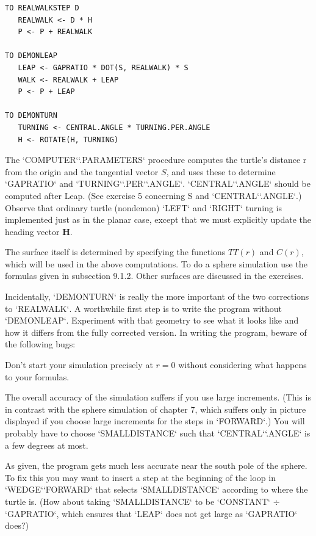 \documentclass{book}
\begin{document}
\begin{verbatim}
TO REALWALKSTEP D
   REALWALK <- D * H
   P <- P + REALWALK

TO DEMONLEAP
   LEAP <- GAPRATIO * DOT(S, REALWALK) * S
   WALK <- REALWALK + LEAP
   P <- P + LEAP

TO DEMONTURN
   TURNING <- CENTRAL.ANGLE * TURNING.PER.ANGLE
   H <- ROTATE(H, TURNING)
\end{verbatim}
The \textsc{`COMPUTER`}\textsc{`.PARAMETERS`} procedure computes the turtle's distance
r from the origin and the tangential vector $S$, and uses these to determine \textsc{`GAPRATIO`} and \textsc{`TURNING`}\textsc{`.PER`}\textsc{`.ANGLE`}. \textsc{`CENTRAL`}\textsc{`.ANGLE`} should be
computed after Leap. (See exercise 5 concerning S and \textsc{`CENTRAL`}\textsc{`.ANGLE`}.)
Observe that ordinary turtle (nondemon) \textsc{`LEFT`} and \textsc{`RIGHT`} turning is
implemented just as in the planar case, except that we must explicitly
update the heading vector \textbf{H}.

The surface itself is determined by specifying the functions $TT(r)$ and
$C(r)$, which will be used in the above computations. To do a sphere
simulation use the formulas given in subsection 9.1.2. Other surfaces
are discussed in the exercises.

Incidentally, \textsc{`DEMONTURN`} is really the more important of the two corrections to \textsc{`REALWALK`}. A worthwhile first step is to write the program
without \textsc{`DEMONLEAP`}. Experiment with that geometry to see what it looks
like and how it differs from the fully corrected version.
In writing the program, beware of the following bugs:

Don't start your simulation precisely at $r = 0$ without considering
what happens to your formulas.

The overall accuracy of the simulation suffers if you use large increments. (This is in contrast with the sphere simulation of chapter 7,
which suffers only in picture displayed if you choose large increments for
the steps in \textsc{`FORWARD`}.) You will probably have to choose \textsc{`SMALLDISTANCE`}
such that \textsc{`CENTRAL`}\textsc{`.ANGLE`} is a few degrees at most.

As given, the program gets much less accurate near the south pole of
the sphere. To fix this you may want to insert a step at the beginning
of the loop in \textsc{`WEDGE`}\textsc{`FORWARD`} that selects \textsc{`SMALLDISTANCE`} according to
where the turtle is. (How about taking \textsc{`SMALLDISTANCE`} to be \textsc{`CONSTANT`} $\div$
\textsc{`GAPRATIO`}, which ensures that \textsc{`LEAP`} does not get large as \textsc{`GAPRATIO`} does?)
\end{document}
